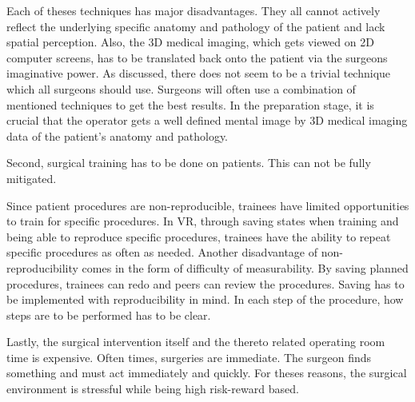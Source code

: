 Each of theses techniques has major disadvantages.
They all cannot actively reflect the underlying specific anatomy and pathology of the patient and lack spatial perception.
Also, the 3D medical imaging, which gets viewed on 2D computer screens, has to be translated back onto the patient via the surgeons imaginative power. 
As discussed, there does not seem to be a trivial technique which all surgeons should use.
Surgeons will often use a combination of mentioned techniques to get the best results.
In the preparation stage, it is crucial that the operator gets a well defined mental image by 3D medical imaging data of the patient's anatomy and pathology.

Second, surgical training has to be done on patients.
This can not be fully mitigated.

Since patient procedures are non-reproducible, trainees have limited opportunities to train for specific procedures.
In VR, through saving states when training and being able to reproduce specific procedures, trainees have the ability to repeat specific procedures as often as needed.
\newline
Another disadvantage of non-reproducibility comes in the form of difficulty of measurability.
By saving planned procedures, trainees can redo and peers can review the procedures.
Saving has to be implemented with reproducibility in mind.
In each step of the procedure, how steps are to be performed has to be clear.

Lastly, the surgical intervention itself and the thereto related operating room time is expensive.
Often times, surgeries are immediate.
The surgeon finds something and must act immediately and quickly.
For theses reasons, the surgical environment is stressful while being high risk-reward based.